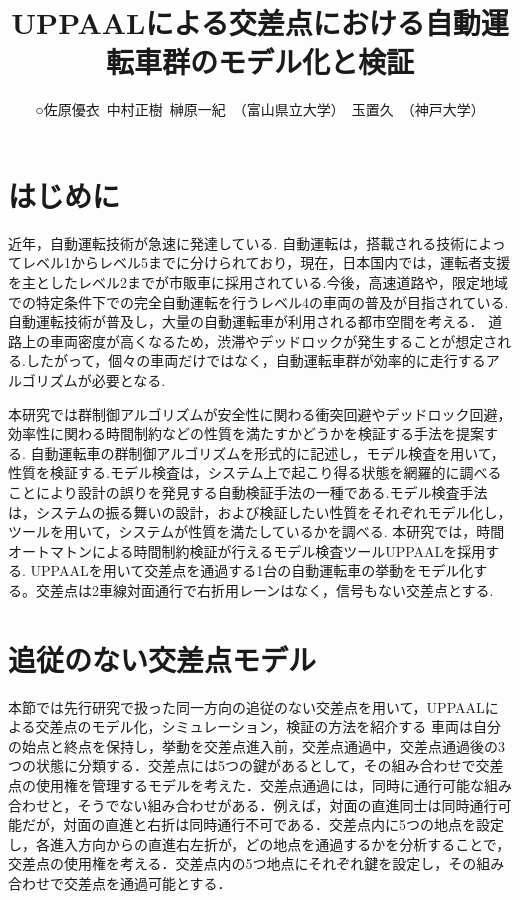 \documentclass{jarticle}
\begin{document}
\title{UPPAALによる交差点における自動運転車群のモデル化と検証}
\author{○佐原優衣\ 中村正樹\ 榊原一紀\ （富山県立大学）\ 玉置久\ （神戸大学）}



\maketitle\thispagestyle{empty}
\pagestyle{empty}

\section{はじめに}
近年，自動運転技術が急速に発達している. 自動運転は，搭載される技術によってレベル1からレベル5までに分けられており，現在，日本国内では，運転者支援を主としたレベル2までが市販車に採用されている.今後，高速道路や，限定地域での特定条件下での完全自動運転を行うレベル4の車両の普及が目指されている.
自動運転技術が普及し，大量の自動運転車が利用される都市空間を考える．
道路上の車両密度が高くなるため，渋滞やデッドロックが発生することが想定される.したがって，個々の車両だけではなく，自動運転車群が効率的に走行するアルゴリズムが必要となる.

本研究では群制御アルゴリズムが安全性に関わる衝突回避やデッドロック回避，効率性に関わる時間制約などの性質を満たすかどうかを検証する手法を提案する.
自動運転車の群制御アルゴリズムを形式的に記述し，モデル検査を用いて，性質を検証する.モデル検査は，システム上で起こり得る状態を網羅的に調べることにより設計の誤りを発見する自動検証手法の一種である.モデル検査手法は，システムの振る舞いの設計，および検証したい性質をそれぞれモデル化し，ツールを用いて，システムが性質を満たしているかを調べる.
本研究では，時間オートマトン\cite{u3}による時間制約検証が行えるモデル検査ツールUPPAAL\cite{u1,u2}を採用する.
UPPAALを用いて交差点を通過する1台の自動運転車の挙動をモデル化する。交差点は2車線対面通行で右折用レーンはなく，信号もない交差点とする.
\section{追従のない交差点モデル}
本節では先行研究\cite{a,a1}で扱った同一方向の追従のない交差点を用いて，UPPAALによる交差点のモデル化，シミュレーション，検証の方法を紹介する
車両は自分の始点と終点を保持し，挙動を交差点進入前，交差点通過中，交差点通過後の3つの状態に分類する．交差点には5つの鍵があるとして，その組み合わせで交差点の使用権を管理するモデルを考えた．交差点通過には，同時に通行可能な組み合わせと，そうでない組み合わせがある．例えば，対面の直進同士は同時通行可能だが，対面の直進と右折は同時通行不可である．交差点内に5つの地点を設定し，各進入方向からの直進右左折が，どの地点を通過するかを分析することで，交差点の使用権を考える．交差点内の5つ地点にそれぞれ鍵を設定し，その組み合わせで交差点を通過可能とする．
\end{document}
